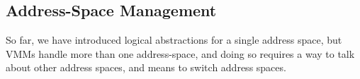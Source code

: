 \subsection{Address-Space Management}
\label{sec:aspacemanagement}
So far, we have introduced logical abstractions for a single address space, but VMMs
 handle more than one address-space,
and doing so requires a way to talk about other address spaces, and means to switch address spaces.



